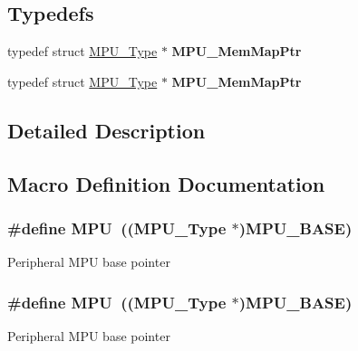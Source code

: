 \subsection*{Typedefs}
\begin{DoxyCompactItemize}
\item 
typedef struct \hyperlink{structMPU__Type}{M\+P\+U\+\_\+\+Type} $\ast$ {\bfseries M\+P\+U\+\_\+\+Mem\+Map\+Ptr}\hypertarget{group__MPU__Peripheral__Access__Layer_gae30dba501b3da4beef962e366777d2e0}{}\label{group__MPU__Peripheral__Access__Layer_gae30dba501b3da4beef962e366777d2e0}

\item 
typedef struct \hyperlink{structMPU__Type}{M\+P\+U\+\_\+\+Type} $\ast$ {\bfseries M\+P\+U\+\_\+\+Mem\+Map\+Ptr}\hypertarget{group__MPU__Peripheral__Access__Layer_gae30dba501b3da4beef962e366777d2e0}{}\label{group__MPU__Peripheral__Access__Layer_gae30dba501b3da4beef962e366777d2e0}

\end{DoxyCompactItemize}


\subsection{Detailed Description}


\subsection{Macro Definition Documentation}
\subsubsection[{\texorpdfstring{M\+PU}{MPU}}]{\setlength{\rightskip}{0pt plus 5cm}\#define M\+PU~(({\bf M\+P\+U\+\_\+\+Type} $\ast$){\bf M\+P\+U\+\_\+\+B\+A\+SE})}\hypertarget{group__MPU__Peripheral__Access__Layer_gaad8182e72fe5037a6ba1eb65a1554e0b}{}\label{group__MPU__Peripheral__Access__Layer_gaad8182e72fe5037a6ba1eb65a1554e0b}
Peripheral M\+PU base pointer 
\subsubsection[{\texorpdfstring{M\+PU}{MPU}}]{\setlength{\rightskip}{0pt plus 5cm}\#define M\+PU~(({\bf M\+P\+U\+\_\+\+Type} $\ast$){\bf M\+P\+U\+\_\+\+B\+A\+SE})}\hypertarget{group__MPU__Peripheral__Access__Layer_gaad8182e72fe5037a6ba1eb65a1554e0b}{}\label{group__MPU__Peripheral__Access__Layer_gaad8182e72fe5037a6ba1eb65a1554e0b}
Peripheral M\+PU base pointer 

